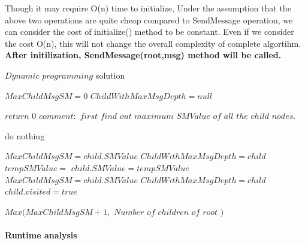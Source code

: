 Though it may require O(n) time to initialize, Under the assumption that the above two operations are quite cheap compared to SendMessage operation, we can consider the cost of initialize() method to be constant. Even if we consider the cost O(n), this will not change the overall complexity of complete algortihm. \\

\textbf{After initilization, SendMessage(root,msg) method will be called. }




\begin{algorithm}
	\caption{$Dynamic $ $programming$ solution}
	\begin{algorithmic}
		\State $ MaxChildMsgSM = 0 $
		\State $ ChildWithMaxMsgDepth = null $
		
			\State $ return$ $ 0$ 	
		\EndIf
	  	\State 		
		\State $comment: $ $ first $ $ find $ $ out $ $ maximum $ $ SMValue $  $ of $ $ all $ $ the $ $ child $ $ nodes.$		
		
		
		\State 
			\State do nothing
		\Else
		\State		
		
			 \State			 
				\State			 	
			 	\State $ MaxChildMsgSM = child.SMValue$
				\State $ ChildWithMaxMsgDepth = child $
			  \EndIf
				\State
	     \Else
	     \State
		    \State 	
	     	\State $tempSMValue =  $ 
	     	\State $child.SMValue = tempSMValue$
				\State			 	
			 	\State $ MaxChildMsgSM = child.SMValue$
				\State $ ChildWithMaxMsgDepth = child $
				\State $ child.visited = true $
				\State
			\EndIf
			\State
		\EndIf		
		\State
		\EndIf
		\State
		\EndIf
		\State	
		\EndFor
		
		
		
		\Return $ Max(MaxChildMsgSM + 1,$ $ Number$ $ of $ $ children $ $ of $ $ root $ $ ) $
			 				
		
		
	  \EndFunction
	
	  
	\end{algorithmic}
\end{algorithm}

\paragraph{Runtime analysis}

